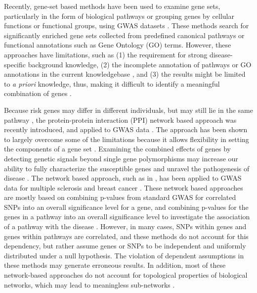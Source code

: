 \documentclass[10pt]{article}
\begin{document}
Recently, gene-set based methods have been used to examine gene sets, particularly in the form of biological pathways or grouping genes by cellular functions or functional groups, using GWAS datasets \cite{path,dushl}. These methods search for significantly enriched gene sets collected from predefined canonical pathways or functional annotations such as Gene Ontology (GO) terms. However, these approaches have limitations, such as (1) the requirement for strong disease-specific background knowledge, (2) the incomplete annotation of pathways or GO annotations in the current knowledgebase \cite{philp}, and (3) the results might be limited to \textit{a priori} knowledge, thus, making it difficult to identify a meaningful combination of genes \cite{ruao}. 

Because risk genes may differ in different individuals, but may still lie in the same pathway \cite{barazi,rita,peng}, the protein-protein interaction (PPI) network based approach was recently introduced, and applied to GWAS data \cite{jia,ott,barazi}. The approach has been shown to largely overcome some of the limitations because it allows flexibility in setting the components of a gene set \cite{peng,jia,rita,marlob}. Examining the combined effects of genes by detecting genetic signals beyond single gene polymorphisms may increase our ability to fully characterize the susceptible genes and unravel the pathogenesis of disease \cite{peng,jia,rita,marlob}. The network based approach, such as in \cite{jia,barazi,dushl,ott}, has been applied to GWAS data for multiple sclerosis \cite{barazi} and breast cancer \cite{jia}. These network based approaches are mostly based on combining p-values from standard GWAS for correlated SNPs into an overall significance level for a gene, and combining p-values for the genes in a pathway into an overall significance level to investigate the association of a pathway with the disease \cite{jia,ott}. However, in many cases, SNPs within genes and genes within pathways are correlated, and these methods do not account for this dependency, but rather assume genes or SNPs to be independent and uniformly distributed under a null hypothesis. The violation of dependent assumptions in these methods may generate erroneous results. In addition, most of these network-based approaches do not account for topological properties of biological networks, which may lead to meaningless sub-networks \cite{add1}.
\end{document}
